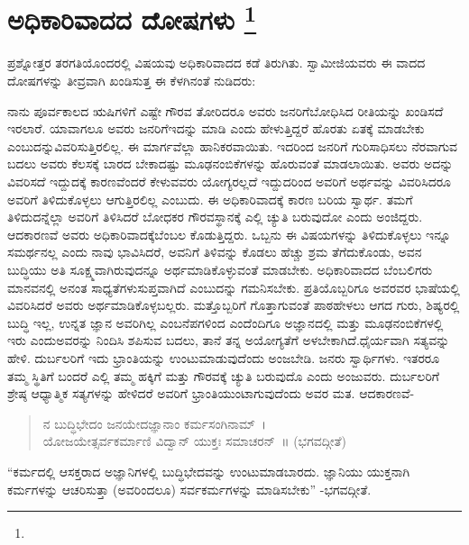 
\vspace{-0.6cm}

\chapter[ಅಧಿಕಾರಿವಾದದ ದೋಷಗಳು ]{ಅಧಿಕಾರಿವಾದದ ದೋಷಗಳು \protect\footnote{}}

ಪ್ರಶ್ನೋತ್ತರ ತರಗತಿಯೊಂದರಲ್ಲಿ ವಿಷಯವು ಅಧಿಕಾರಿವಾದದ ಕಡೆ ತಿರುಗಿತು. ಸ್ವಾಮೀಜಿಯವರು ಈ ವಾದದ ದೋಷಗಳನ್ನು ತೀವ್ರವಾಗಿ ಖಂಡಿಸುತ್ತ ಈ ಕೆಳಗಿನಂತೆ ನುಡಿದರು:

ನಾನು ಪೂರ್ವಕಾಲದ ಋಷಿಗಳಿಗೆ ಎಷ್ಟೇ ಗೌರವ ತೋರಿದರೂ ಅವರು ಜನರಿಗೆ\break ಬೋಧಿಸಿದ ರೀತಿಯನ್ನು ಖಂಡಿಸದೆ ಇರಲಾರೆ. ಯಾವಾಗಲೂ ಅವರು ಜನರಿಗೆ\break ಇದನ್ನು ಮಾಡಿ ಎಂದು ಹೇಳುತ್ತಿದ್ದರೆ ಹೊರತು ಏತಕ್ಕೆ ಮಾಡಬೇಕು ಎಂಬುದನ್ನು\break ವಿವರಿಸುತ್ತಿರಲಿಲ್ಲ. ಈ ಮಾರ್ಗವೆಲ್ಲಾ ಹಾನಿಕರವಾಯಿತು. ಇದರಿಂದ ಜನರಿಗೆ ಗುರಿ\break ಸಾಧಿಸಲು ನೆರವಾಗುವ ಬದಲು ಅವರು ಕೆಲಸಕ್ಕೆ ಬಾರದ ಬೇಕಾದಷ್ಟು ಮೂಢನಂಬಿಕೆಗಳನ್ನು ಹೊರುವಂತೆ ಮಾಡಲಾಯಿತು. ಅವರು ಅದನ್ನು ವಿವರಿಸದೆ ಇದ್ದುದಕ್ಕೆ ಕಾರಣವೆಂದರೆ ಕೇಳುವವರು ಯೋಗ್ಯರಲ್ಲದೆ ಇದ್ದುದರಿಂದ ಅವರಿಗೆ ಅರ್ಥವನ್ನು ವಿವರಿಸಿದರೂ ಅವರಿಗೆ ತಿಳಿದುಕೊಳ್ಳಲು ಆಗುತ್ತಿರಲಿಲ್ಲ ಎಂಬುದು. ಈ ಅಧಿಕಾರಿವಾದಕ್ಕೆ ಕಾರಣ ಬರಿಯ ಸ್ವಾರ್ಥ. ತಮಗೆ ತಿಳಿದುದನ್ನೆಲ್ಲಾ ಅವರಿಗೆ ತಿಳಿಸಿದರೆ ಬೋಧಕರ ಗೌರವಸ್ಥಾನಕ್ಕೆ ಎಲ್ಲಿ ಚ್ಯುತಿ ಬರುವುದೋ ಎಂದು ಅಂಜಿದ್ದರು. ಆದಕಾರಣವೆ ಅವರು ಅಧಿಕಾರಿವಾದಕ್ಕೆ\break ಬೆಂಬಲ ಕೊಡುತ್ತಿದ್ದರು. ಒಬ್ಬನು ಈ ವಿಷಯಗಳನ್ನು ತಿಳಿದುಕೊಳ್ಳಲು ಇನ್ನೂ ಸಮರ್ಥನಲ್ಲ ಎಂದು ನಾವು ಭಾವಿಸಿದರೆ, ಅವನಿಗೆ ತಿಳಿವನ್ನು ಕೊಡಲು ಹೆಚ್ಚು ಶ್ರಮ ತೆಗೆದುಕೊಂಡು, ಅವನ ಬುದ್ಧಿಯು ಅತಿ ಸೂಕ್ಷ್ಮವಾಗಿರುವುದನ್ನೂ ಅರ್ಥಮಾಡಿಕೊಳ್ಳುವಂತೆ ಮಾಡಬೇಕು. ಅಧಿಕಾರಿ\-ವಾದದ ಬೆಂಬಲಿಗರು ಮಾನವನಲ್ಲಿ ಅನಂತ ಸಾಧ್ಯತೆಗಳು\break ಸುಪ್ತವಾಗಿದೆ ಎಂಬುದನ್ನು ಗಮನಿಸಬೇಕು. ಪ್ರತಿಯೊಬ್ಬರಿಗೂ ಅವರವರ ಭಾಷೆಯಲ್ಲಿ ವಿವರಿಸಿದರೆ ಅವರು ಅರ್ಥಮಾಡಿಕೊಳ್ಳಬಲ್ಲರು. ಮತ್ತೊಬ್ಬರಿಗೆ ಗೊತ್ತಾಗುವಂತೆ ಪಾಠ\break ಹೇಳಲು ಆಗದ ಗುರು, ಶಿಷ್ಯರಲ್ಲಿ ಬುದ್ಧಿ ಇಲ್ಲ, ಉನ್ನತ ಜ್ಞಾನ ಅವರಿಗಿಲ್ಲ ಎಂಬ\break ನೆಪಗಳಿಂದ ಎಂದೆಂದಿಗೂ ಅಜ್ಞಾನದಲ್ಲಿ ಮತ್ತು ಮೂಢನಂಬಿಕೆಗಳಲ್ಲಿ ಇರು ಎಂದು\break ಅವರನ್ನು ನಿಂದಿಸಿ ಶಪಿಸುವ ಬದಲು, ತಾನೆ ತನ್ನ ಅಯೋಗ್ಯತೆಗೆ ಅಳಬೇಕಾಗಿದೆ.\break ಧೈರ್ಯವಾಗಿ ಸತ್ಯವನ್ನು ಹೇಳಿ. ದುರ್ಬಲರಿಗೆ ಇದು ಭ್ರಾಂತಿಯನ್ನು ಉಂಟುಮಾಡುವುದೆಂದು ಅಂಜಬೇಡಿ. ಜನರು ಸ್ವಾರ್ಥಿಗಳು. ಇತರರೂ ತಮ್ಮ ಸ್ಥಿತಿಗೆ ಬಂದರೆ ಎಲ್ಲಿ ತಮ್ಮ ಹಕ್ಕಿಗೆ ಮತ್ತು ಗೌರವಕ್ಕೆ ಚ್ಯುತಿ ಬರುವುದೊ ಎಂದು ಅಂಜುವರು. ದುರ್ಬಲರಿಗೆ ಶ್ರೇಷ್ಠ ಆಧ್ಯಾತ್ಮಿಕ ಸತ್ಯಗಳನ್ನು ಹೇಳಿದರೆ ಅವರಿಗೆ ಭ್ರಾಂತಿಯುಂಟಾಗುವುದೆಂದು ಅವರ ಮತ. ಆದಕಾರಣವೆ-

\begin{verse}
 ನ ಬುದ್ಧಿಭೇದಂ ಜನಯೇದಜ್ಞಾನಾಂ ಕರ್ಮಸಂಗಿನಾಮ್​~।\\
 ಯೋಜಯೇತ್ಸರ್ವಕರ್ಮಾಣಿ ವಿದ್ವಾನ್​ ಯುಕ್ತಃ ಸಮಾಚರನ್​~॥ (ಭಗವದ್ಗೀತೆ)
\end{verse}

“ಕರ್ಮದಲ್ಲಿ ಆಸಕ್ತರಾದ ಅಜ್ಞಾನಿಗಳಲ್ಲಿ ಬುದ್ಧಿಭೇದವನ್ನು ಉಂಟುಮಾಡಬಾರದು. ಜ್ಞಾನಿಯು ಯುಕ್ತನಾಗಿ ಕರ್ಮಗಳನ್ನು ಆಚರಿಸುತ್ತಾ (ಅವರಿಂದಲೂ) ಸರ್ವಕರ್ಮಗಳನ್ನು ಮಾಡಿಸಬೇಕು” -ಭಗವದ್ಗೀತೆ.

